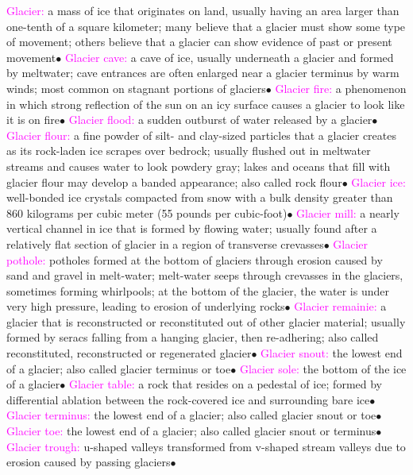 \documentclass{article}
\newcommand{\ddd}{$\bullet$}
\newcommand{\pink}[1]{\textcolor{magenta}{#1}}
\newcommand{\vocab}[1]{{\pink{#1}}}
\begin{document}
\begin{multicols*}{4}
		\vocab{        Glacier: } a mass of ice that originates on land, usually having an area larger than one-tenth of a square kilometer; many believe that a glacier must show some type of movement; others believe that a glacier can show evidence of past or present movement\ddd
		\vocab{        Glacier cave: } a cave of ice, usually underneath a glacier and formed by meltwater; cave entrances are often enlarged near a glacier terminus by warm winds; most common on stagnant portions of glaciers\ddd
		\vocab{        Glacier fire: } a phenomenon in which strong reflection of the sun on an icy surface causes a glacier to look like it is on fire\ddd
		\vocab{        Glacier flood: } a sudden outburst of water released by a glacier\ddd
		\vocab{        Glacier flour: } a fine powder of silt- and clay-sized particles that a glacier creates as its rock-laden ice scrapes over bedrock; usually flushed out in meltwater streams and causes water to look powdery gray; lakes and oceans that fill with glacier flour may develop a banded appearance; also called rock flour\ddd
		\vocab{        Glacier ice: } well-bonded ice crystals compacted from snow with a bulk density greater than 860 kilograms per cubic meter (55 pounds per cubic-foot)\ddd
		\vocab{        Glacier mill: } a nearly vertical channel in ice that is formed by flowing water; usually found after a relatively flat section of glacier in a region of transverse crevasses\ddd
		\vocab{        Glacier pothole: } potholes formed at the bottom of glaciers through erosion caused by sand and gravel in melt-water; melt-water seeps through crevasses in the glaciers, sometimes forming whirlpools; at the bottom of the glacier, the water is under very high pressure, leading to erosion of underlying rocks\ddd
		\vocab{        Glacier remainie: } a glacier that is reconstructed or reconstituted out of other glacier material; usually formed by seracs falling from a hanging glacier, then re-adhering; also called reconstituted, reconstructed or regenerated glacier\ddd
		\vocab{        Glacier snout: } the lowest end of a glacier; also called glacier terminus or toe\ddd
		\vocab{        Glacier sole: } the bottom of the ice of a glacier\ddd
		\vocab{        Glacier table: } a rock that resides on a pedestal of ice; formed by differential ablation between the rock-covered ice and surrounding bare ice\ddd
		\vocab{        Glacier terminus: } the lowest end of a glacier; also called glacier snout or toe\ddd
		\vocab{        Glacier toe: } the lowest end of a glacier; also called glacier snout or terminus\ddd
		\vocab{        Glacier trough: } u-shaped valleys transformed from v-shaped stream valleys due to erosion caused by passing glaciers\ddd

\end{multicols*}
\end{document}
